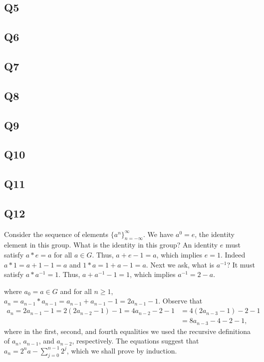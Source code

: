 \documentclass[12pt]{article}
\numberwithin{theorem}{section}
\numberwithin{equation}{section}
\numberwithin{remark}{section}
\numberwithin{definition}{section}
\numberwithin{theorem}{section}
\numberwithin{lemma}{section}
\numberwithin{example}{section}
\begin{document}
\subsection{Q5}

\subsection{Q6}

\subsection{Q7}

\subsection{Q8}

\subsection{Q9}

\subsection{Q10}

\subsection{Q11}

\subsection{Q12}

Consider the sequence of elements $\{a^n\}_{n=-\infty}^\infty$. We have $a^0=e$, the identity element in this group. What is the identity in this group? An identity $e$ must satisfy $a*e=a$ for all $a\in G$. Thus, $a+e-1=a$, which implies $e=1$. Indeed $a*1=a+1-1=a$ and $1*a=1+a-1=a$. Next we ask, what is $a^{-1}$? It must satisfy $a*a^{-1}=1$. Thus, $a+a^{-1}-1=1$, which implies $a^{-1}=2-a$. 




where $a_0=a\in G$ and for all $n\ge1$, $a_{n}=a_{n-1}*a_{n-1}=a_{n-1}+a_{n-1}-1=2a_{n-1}-1$. Observe that
\begin{align*}
	a_n=2a_{n-1}-1=2\left(2a_{n-2}-1\right)-1=4a_{n-2}-2-1&=4\left(2a_{n-3}-1\right)-2-1\\
	&=8a_{n-3}-4-2-1,
\end{align*}
where in the first, second, and fourth equalities we used the recursive definitiona of $a_n$, $a_{n-1}$, and $a_{n-2}$, respectively. The equations suggest that $a_n=2^na-\sum_{j=0}^{n-1}2^j$, which we shall prove by induction. 
\end{document}
